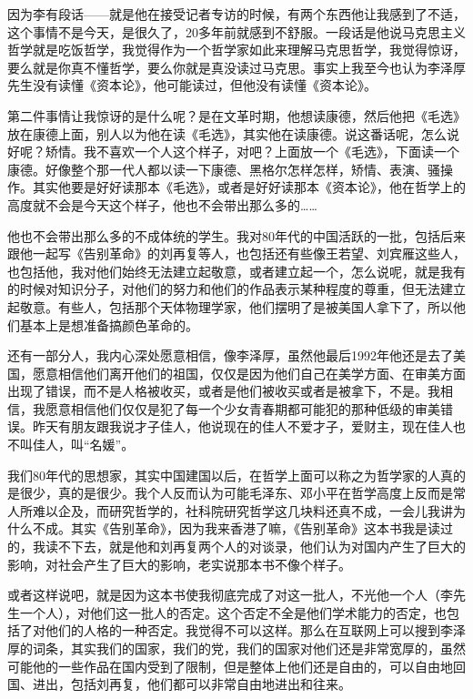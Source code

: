 \documentclass[UTF8, 12pt, a4paper]{ctexrep}
\begin{document}
因为李有段话——就是他在接受记者专访的时候，有两个东西他让我感到了不适，这个事情不是今天，是很久了，20多年前就感到不舒服。一段话是他说马克思主义哲学就是吃饭哲学，我觉得作为一个哲学家如此来理解马克思哲学，我觉得惊讶，要么就是你真不懂哲学，要么你就是真没读过马克思。事实上我至今也认为李泽厚先生没有读懂《资本论》，他可能读过，但他没有读懂《资本论》。

第二件事情让我惊讶的是什么呢？是在文革时期，他想读康德，然后他把《毛选》放在康德上面，别人以为他在读《毛选》，其实他在读康德。说这番话呢，怎么说好呢？矫情。我不喜欢一个人这个样子，对吧？上面放一个《毛选》，下面读一个康德。好像整个那一代人都以读一下康德、黑格尔怎样怎样，矫情、表演、骚操作。其实他要是好好读那本《毛选》，或者是好好读那本《资本论》，他在哲学上的高度就不会是今天这个样子，他也不会带出那么多的……

他也不会带出那么多的不成体统的学生。我对80年代的中国活跃的一批，包括后来跟他一起写《告别革命》的刘再复等人，也包括还有些像王若望、刘宾雁这些人，也包括他，我对他们始终无法建立起敬意，或者建立起一个，怎么说呢，就是我有的时候对知识分子，对他们的努力和他们的作品表示某种程度的尊重，但无法建立起敬意。有些人，包括那个天体物理学家，他们摆明了是被美国人拿下了，所以他们基本上是想准备搞颜色革命的。

还有一部分人，我内心深处愿意相信，像李泽厚，虽然他最后1992年他还是去了美国，愿意相信他们离开他们的祖国，仅仅是因为他们自己在美学方面、在审美方面出现了错误，而不是人格被收买，或者是他们被收买或者是被拿下，不是。我相信，我愿意相信他们仅仅是犯了每一个少女青春期都可能犯的那种低级的审美错误。昨天有朋友跟我说才子佳人，他说现在的佳人不爱才子，爱财主，现在佳人也不叫佳人，叫“名媛”。

我们80年代的思想家，其实中国建国以后，在哲学上面可以称之为哲学家的人真的是很少，真的是很少。我个人反而认为可能毛泽东、邓小平在哲学高度上反而是常人所难以企及，而研究哲学的，社科院研究哲学这几块料还真不成，一会儿我讲为什么不成。其实《告别革命》，因为我来香港了嘛，《告别革命》这本书我是读过的，我读不下去，就是他和刘再复两个人的对谈录，他们认为对国内产生了巨大的影响，对社会产生了巨大的影响，老实说那本书不像个样子。

或者这样说吧，就是因为这本书使我彻底完成了对这一批人，不光他一个人（李先生一个人），对他们这一批人的否定。这个否定不全是他们学术能力的否定，也包括了对他们的人格的一种否定。我觉得不可以这样。那么在互联网上可以搜到李泽厚的词条，其实我们的国家，我们的党，我们的国家对他们还是非常宽厚的，虽然可能他的一些作品在国内受到了限制，但是整体上他们还是自由的，可以自由地回国、进出，包括刘再复，他们都可以非常自由地进出和往来。
\end{document}
